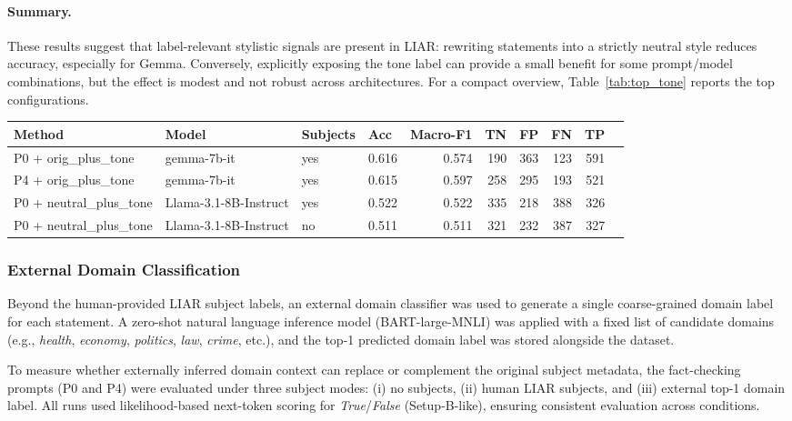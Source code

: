 \paragraph{Summary.}
These results suggest that label-relevant stylistic signals are present in LIAR: rewriting statements into a strictly neutral style reduces accuracy, especially for Gemma. Conversely, explicitly exposing the tone label can provide a small benefit for some prompt/model combinations, but the effect is modest and not robust across architectures. For a compact overview, Table~\ref{tab:top_tone} reports the top configurations.

\begin{minipage}{\linewidth}
\centering
{}
\label{tab:top_tone}
\scriptsize
\begin{tabular}{l l l l r r r r r r}
\toprule
Method & Model & Subjects & Acc & Macro-F1 & TN & FP & FN & TP \\
\midrule
P0 + orig\_plus\_tone    & gemma-7b-it           & yes & 0.616 & 0.574 & 190 & 363 & 123 & 591 \\
P4 + orig\_plus\_tone    & gemma-7b-it           & yes & 0.615 & 0.597 & 258 & 295 & 193 & 521 \\
P0 + neutral\_plus\_tone & Llama-3.1-8B-Instruct & yes & 0.522 & 0.522 & 335 & 218 & 388 & 326 \\
P0 + neutral\_plus\_tone & Llama-3.1-8B-Instruct & no  & 0.511 & 0.511 & 321 & 232 & 387 & 327 \\
\bottomrule
\end{tabular}
\end{minipage}

\subsubsection{External Domain Classification}

Beyond the human-provided LIAR subject labels, an external domain classifier was used to generate a single coarse-grained domain label for each statement. A zero-shot natural language inference model (BART-large-MNLI) was applied with a fixed list of candidate domains (e.g., \textit{health}, \textit{economy}, \textit{politics}, \textit{law}, \textit{crime}, etc.), and the top-1 predicted domain label was stored alongside the dataset.

To measure whether externally inferred domain context can replace or complement the original subject metadata, the fact-checking prompts (P0 and P4) were evaluated under three subject modes: (i) no subjects, (ii) human LIAR subjects, and (iii) external top-1 domain label. All runs used likelihood-based next-token scoring for \textit{True}/\textit{False} (Setup-B-like), ensuring consistent evaluation across conditions.

